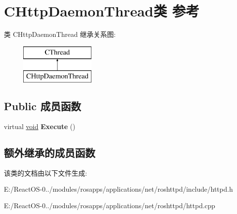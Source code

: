 \hypertarget{class_c_http_daemon_thread}{}\section{C\+Http\+Daemon\+Thread类 参考}
\label{class_c_http_daemon_thread}
类 C\+Http\+Daemon\+Thread 继承关系图\+:\begin{figure}[H]
\begin{center}
\leavevmode
\includegraphics[height=2.000000cm]{class_c_http_daemon_thread}
\end{center}
\end{figure}
\subsection*{Public 成员函数}
\begin{DoxyCompactItemize}
\item 
\mbox{\label{class_c_http_daemon_thread_a97c8ab3b5d388c101757fa98def6f4d6}} 
virtual \hyperlink{interfacevoid}{void} {\bfseries Execute} ()
\end{DoxyCompactItemize}
\subsection*{额外继承的成员函数}


该类的文档由以下文件生成\+:\begin{DoxyCompactItemize}
\item 
E\+:/\+React\+O\+S-\/0../modules/rosapps/applications/net/roshttpd/include/httpd.\+h\item 
E\+:/\+React\+O\+S-\/0../modules/rosapps/applications/net/roshttpd/httpd.\+cpp\end{DoxyCompactItemize}
